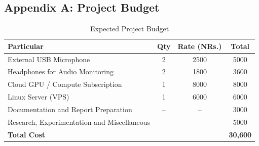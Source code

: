 \subsection*{Appendix A: Project Budget}
{}

\vspace{0.5cm}
\label{app:budget}
\renewcommand{\thetable}{A-\arabic{table}}
\setcounter{table}{0}

\renewcommand{\arraystretch}{1.4}
\setlength{\tabcolsep}{10pt}

\begin{table}[h]
\centering
\caption{Expected Project Budget}

\begin{tabular}{l c c c}
\hline
\textbf{Particular} & \textbf{Qty} & \textbf{Rate (NRs.)} & \textbf{Total} \\
\hline
External USB Microphone & 2 & 2500 & 5000 \\
Headphones for Audio Monitoring & 2 & 1800 & 3600 \\
Cloud GPU / Compute Subscription & 1 & 8000 & 8000 \\
Linux Server (VPS) & 1 & 6000 & 6000 \\
Documentation and Report Preparation & -- & -- & 3000 \\
Research, Experimentation and Miscellaneous & -- & -- & 5000 \\
\hline
\textbf{Total Cost} & & & \textbf{30,600} \\
\hline
\end{tabular}
\end{table}